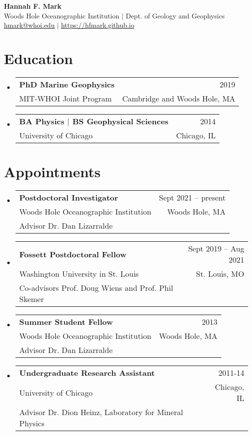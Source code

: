 \documentclass[letterpaper,11pt]{article}
\makeatletter
\newcommand{\resumeSubheading}[4]{
  \vspace{-2pt}\item
    \begin{tabular*}{0.97\textwidth}[t]{l@{\extracolsep{\fill}}r}
      \textbf{#1} & #2 \\
      \small#3 & \small #4 \\
    \end{tabular*}\vspace{-7pt}
}
\newcommand{\resumeAppt}[5]{
  \vspace{-2pt}\item
    \begin{tabular*}{0.97\textwidth}[t]{l@{\extracolsep{\fill}}r}
      \textbf{#1} & #2 \\
      \small#3 & \small #4 \\
      \small#5\\
    \end{tabular*}\vspace{-7pt}
}
\newcommand{\resumeSubHeadingListStart}{\begin{itemize}[leftmargin=0.15in, label={}]}
\newcommand{\resumeSubHeadingListEnd}{\end{itemize}}
\makeatother
\begin{document}
\begin{center}
    \textbf{\LARGE Hannah F. Mark} \\ \vspace{1pt}
    \small Woods Hole Oceanographic Institution $|$ Dept. of Geology and Geophysics \\
    \small \href{mailto:hmark@whoi.edu}{\underline{hmark@whoi.edu}} $|$
    \href{https://hfmark.github.io}{\underline{https://hfmark.github.io}}
\end{center}


\section{Education}
  \resumeSubHeadingListStart
    \resumeSubheading
      {PhD Marine Geophysics}{2019}
      {MIT-WHOI Joint Program}{Cambridge and Woods Hole, MA}
    \resumeSubheading
      {BA Physics $|$ BS Geophysical Sciences}{2014}
      {University of Chicago}{Chicago, IL}
  \resumeSubHeadingListEnd


\section{Appointments}
  \resumeSubHeadingListStart

    \resumeAppt
      {Postdoctoral Investigator}{Sept 2021 -- present}
      {Woods Hole Oceanographic Institution}{Woods Hole, MA}
      {Advisor Dr. Dan Lizarralde}

    \resumeAppt
      {Fossett Postdoctoral Fellow}{Sept 2019 -- Aug 2021}
      {Washington University in St. Louis}{St. Louis, MO}
      {Co-advisors Prof. Doug Wiens and Prof. Phil Skemer}


    \resumeAppt
      {Summer Student Fellow}{2013}
      {Woods Hole Oceanographic Institution}{Woods Hole, MA}
      {Advisor Dr. Dan Lizarralde}

    \resumeAppt
      {Undergraduate Research Assistant}{2011-14}
      {University of Chicago}{Chicago, IL}
      {Advisor Dr. Dion Heinz, Laboratory for Mineral Physics}

  \resumeSubHeadingListEnd


\end{document}
